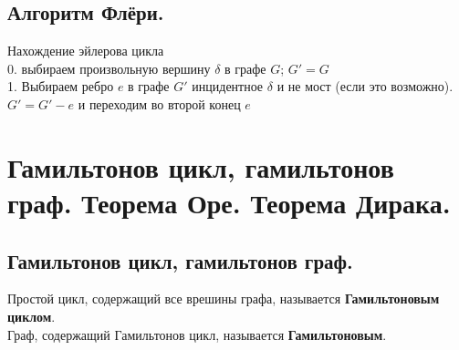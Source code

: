 \documentclass[12pt]{article}
\begin{document}
\subsection{Алгоритм Флёри.}
	Нахождение эйлерова цикла\\
		0. выбираем произвольную вершину $\delta$ в графе $G$; $G' = G$\\
		1. Выбираем ребро $e$ в графе $G'$ инцидентное $\delta$ и не мост (если это возможно).\\
		$G' = G' - e$ и переходим во второй конец $e$
\section{Гамильтонов цикл, гамильтонов граф. Теорема Оре. Теорема Дирака.}
\subsection{Гамильтонов цикл, гамильтонов граф.}
	Простой цикл, содержащий все врешины графа, называется \textbf{Гамильтоновым циклом}.\\
	Граф, содержащий Гамильтонов цикл, называется \textbf{Гамильтоновым}.\\
\end{document}
